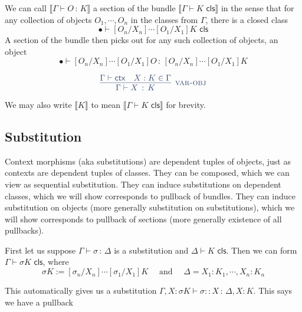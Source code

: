 \documentclass{article}
\newcommand{\bbrkt}[1]{\llbracket #1 \rrbracket}
\newcommand{\Subst}[3]{[#1 / #2] #3}
\newcommand{\CtxExt}[3]{#1,#2 : #3}
\newcommand{\CtxJdg}[1]{#1 \vdash \mathsf{ctx}}
\newcommand{\ClsJdg}[2]{#1 \vdash #2 \,\, \mathsf{cls}}
\newcommand{\ObjJdg}[3]{#1 \vdash #2 \, : \, #3 }
\newcommand{\<}{\langle}
\renewcommand{\>}{\rangle}
\newcommand{\si}{\sigma}
\newcommand{\Ga}{\Gamma}
\newcommand{\De}{\Delta}
\newcommand{\id}[1]{\mathbbm{1}_{#1}}
\theoremstyle{definitionstyle}
\theoremstyle{exercisestyle}
\theoremstyle{remarkstyle}
\newenvironment{cd}{
    \begin{figure}[H]
    \centering
    \begin{tikzcd}
}{
    \end{tikzcd}
    \end{figure}
}
\begin{document}
We can call $\bbrkt{\ObjJdg{\Ga}{O}{K}}$
a section of the bundle $\bbrkt{\ClsJdg{\Ga}{K}}$
in the sense that for any collection of objects $O_{1},\cdots,O_{n}$ in the classes from $\Ga$,
there is a closed class \[\ClsJdg{\bullet}{[O_{n}/X_{n}] \cdots \Subst{O_{1}}{X_{1}}{K}}\]
A section of the bundle then picks out for any such collection of objects,
an object \[\ObjJdg{\bullet}{[O_{n}/X_{n}] \cdots \Subst{O_{1}}{X_{1}}{O}}{[O_{n}/X_{n}] \cdots \Subst{O_{1}}{X_{1}}{K}}\]
\begin{multicols}{2}

    \[\color{syntax}  \infer[\textsc{var-obj}]{\ObjJdg{\Ga}{X}{K}}
    {\CtxJdg{\Ga} & X:K \in \Ga}\]


  \color{semantics}{
  \begin{cd}
     {\bbrkt{\Ga}} && {\bbrkt{\Ga,Y:K}} \\
    & {\bbrkt{\Ga}}
    \arrow["{\bbrkt{\ObjJdg{\Ga}{X}{K}}}", from=1-1, to=1-3]
    \arrow["{\id{\bbrkt{\Ga}}}"', from=1-1, to=2-2]
    \arrow["{\bbrkt{\ClsJdg{\Ga}{K}}}", from=1-3, to=2-2]
  \end{cd}
  }
\end{multicols}

We may also write $\bbrkt{K}$ to mean $\bbrkt{\ClsJdg{\Ga}{K}}$ for brevity.

\subsection{Substitution}

Context morphisms (aka substitutions) are dependent tuples of objects,
just as contexts are dependent tuples of classes.
They can be {\color{semantics} composed}, which we can view as {\color{syntax} sequential substitution}.
They can induce {\color{syntax} substitutions on dependent classes},
which we will show corresponds to {\color{semantics} pullback of bundles}.
They can induce {\color{syntax} substitution on objects} (more generally {\color{syntax} substitution on substitutions}),
which we will show corresponds to {\color{semantics} pullback of sections}
(more generally {\color{semantics} existence of all pullbacks}).

First let us suppose $\ObjJdg{\Ga}{\si}{\De}$ is a substitution and $\ClsJdg{\De}{K}$.
Then we can form $\ClsJdg{\Ga}{\si K}$,
where
\[ \si K := \Subst{\si_{n}}{X_{n}}{ \cdots \Subst{\si_{1}}{X_{1}}{K}} \quad \text{ and }
  \quad \De = \CtxExt{X_{1}:K_{1}}{\cdots, X_{n}}{K_{n}}\]

This automatically gives us a substitution $\ObjJdg{\CtxExt{\Ga}{X}{\si K}}{\si :: X}{{\CtxExt{\De}{X}{K}}}$.
This says we have a pullback
\end{document}
